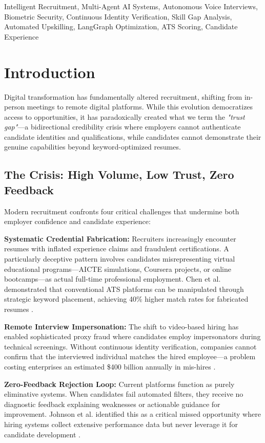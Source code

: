 \documentclass[conference]{IEEEtran}
\begin{document}
\begin{IEEEkeywords}
Intelligent Recruitment, Multi-Agent AI Systems, Autonomous Voice Interviews, Biometric Security, Continuous Identity Verification, Skill Gap Analysis, Automated Upskilling, LangGraph Optimization, ATS Scoring, Candidate Experience
\end{IEEEkeywords}

\section{Introduction}

Digital transformation has fundamentally altered recruitment, shifting from in-person meetings to remote digital platforms. While this evolution democratizes access to opportunities, it has paradoxically created what we term the \textit{"trust gap"}—a bidirectional credibility crisis where employers cannot authenticate candidate identities and qualifications, while candidates cannot demonstrate their genuine capabilities beyond keyword-optimized resumes.

\subsection{The Crisis: High Volume, Low Trust, Zero Feedback}

Modern recruitment confronts four critical challenges that undermine both employer confidence and candidate experience:

\textbf{Systematic Credential Fabrication:} Recruiters increasingly encounter resumes with inflated experience claims and fraudulent certifications. A particularly deceptive pattern involves candidates misrepresenting virtual educational programs—AICTE simulations, Coursera projects, or online bootcamps—as actual full-time professional employment. Chen et al. demonstrated that conventional ATS platforms can be manipulated through strategic keyword placement, achieving 40\% higher match rates for fabricated resumes \cite{chen2023multimodal}.

\textbf{Remote Interview Impersonation:} The shift to video-based hiring has enabled sophisticated proxy fraud where candidates employ impersonators during technical screenings. Without continuous identity verification, companies cannot confirm that the interviewed individual matches the hired employee—a problem costing enterprises an estimated \$400 billion annually in mis-hires \cite{mukherjee2022impact}.

\textbf{Zero-Feedback Rejection Loop:} Current platforms function as purely eliminative systems. When candidates fail automated filters, they receive no diagnostic feedback explaining weaknesses or actionable guidance for improvement. Johnson et al. identified this as a critical missed opportunity where hiring systems collect extensive performance data but never leverage it for candidate development \cite{johnson2022fairness}.
\end{document}

